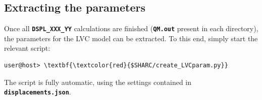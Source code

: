\documentclass[a4paper,11pt,DIV=15,openany]{scrbook}
\newcommand{\ttt}[1]{\textbf{\texttt{#1}}}
\begin{document}

\subsection{Extracting the parameters}

Once all \ttt{DSPL\_XXX\_YY} calculations are finished (\ttt{QM.out} present in each directory), the parameters for the LVC model can be extracted.
To this end, simply start the relevant script:
\begin{Verbatim}[commandchars=\\\{\}]
user@host> \textbf{\textcolor{red}{$SHARC/create_LVCparam.py}}
\end{Verbatim}
The script is fully automatic, using the settings contained in \ttt{displacements.json}.
\end{document}
